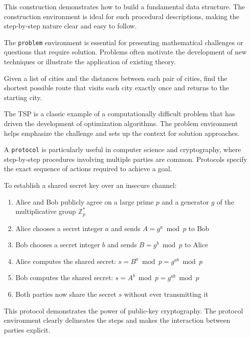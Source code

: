 \documentclass[9pt]{amsart}
\begin{document}
This construction demonstrates how to build a fundamental data structure. The
construction environment is ideal for such procedural descriptions, making the
step-by-step nature clear and easy to follow.

The \texttt{problem} environment is essential for presenting mathematical
challenges or questions that require solution. Problems often motivate the
development of new techniques or illustrate the application of existing theory.

\begin{problem}
	Given a list of cities and the distances between each pair of cities, find the shortest possible route that visits each city exactly once and returns to the starting city.
\end{problem}

The TSP is a classic example of a computationally difficult problem that has
driven the development of optimization algorithms. The problem environment
helps emphasize the challenge and sets up the context for solution approaches.

A \texttt{protocol} is particularly useful in computer science and
cryptography, where step-by-step procedures involving multiple parties are
common. Protocols specify the exact sequence of actions required to achieve a
goal.

\begin{protocol}
	To establish a shared secret key over an insecure channel:
	\begin{enumerate}
		\item Alice and Bob publicly agree on a large prime $p$ and a generator $g$ of the
		      multiplicative group $\mathbb{Z}_p^*$
		\item Alice chooses a secret integer $a$ and sends $A = g^a \bmod p$ to Bob
		\item Bob chooses a secret integer $b$ and sends $B = g^b \bmod p$ to Alice
		\item Alice computes the shared secret: $s = B^a \bmod p = g^{ab} \bmod p$
		\item Bob computes the shared secret: $s = A^b \bmod p = g^{ab} \bmod p$
		\item Both parties now share the secret $s$ without ever transmitting it
	\end{enumerate}
\end{protocol}

This protocol demonstrates the power of public-key cryptography. The protocol
environment clearly delineates the steps and makes the interaction between
parties explicit.
\end{document}
